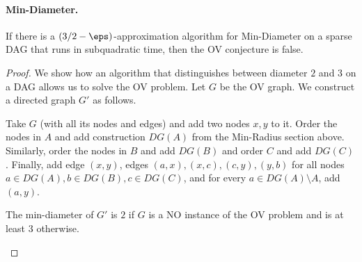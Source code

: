 \paragraph{Min-Diameter.}
\begin{lemma}
\label{lem:MinDiamDAG}
If there is a $(3/2-\eps)$-approximation algorithm for Min-Diameter on a sparse DAG that runs in subquadratic time, then the OV conjecture is false.
\end{lemma}
\begin{proof}

We show how an algorithm that distinguishes between diameter $2$ and $3$ on a DAG allows us to solve the OV problem.
Let $G$ be the OV graph.
We construct a directed graph $G'$ as follows.

Take $G$ (with all its nodes and edges) and add two nodes $x,y$ to it.
Order the nodes in $A$ and add construction $DG(A)$ from the Min-Radius section above.
Similarly, order the nodes in $B$ and add $DG(B)$ and order $C$ and add $DG(C)$.
Finally, add edge $(x,y)$, edges $(a,x),(x,c),(c,y),(y,b)$ for all nodes $a \in DG(A), b \in DG(B), c \in DG(C)$, and for every $a\in DG(A)\setminus A$, add $(a,y)$.

\begin{claim}
The min-diameter of $G'$ is $2$ if $G$ is a NO instance of the OV problem and is at least $3$ otherwise.
\end{claim}


\end{proof}

